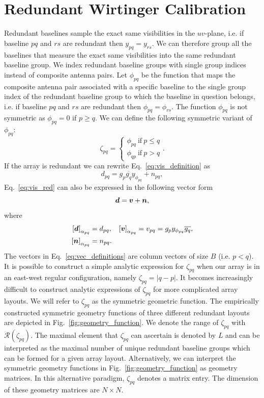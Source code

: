 \documentclass[useAMS,usenatbib]{mn2e}
\newcommand{\bd}{\bmath{d}}
\newcommand{\bv}{\bmath{v}}
\newcommand{\bn}{\bmath{n}}
\newcommand{\conj}[1]{\overline{#1}}
\begin{document}
\section{Redundant Wirtinger Calibration}
\label{sec:red_wirtinger}
Redundant baselines sample the exact same visibilities in the $uv$-plane, i.e. if baseline $pq$ and $rs$ are redundant then $y_{pq} = y_{rs}$. 
We can therefore group all the baselines that measure the exact same visibilities into the same redundant baseline group. We index redundant baseline 
groups with single group indices instead of composite antenna pairs. Let $\phi_{pq}$ be the function that maps the composite antenna pair associated with a specific baseline 
to the single group index of the redundant baseline group to which the baseline in question belongs, i.e. if baseline $pq$ and $rs$ are redundant then $\phi_{pq} = \phi_{rs}$.  
The function $\phi_{pq}$ is not symmetric as 
$\phi_{pq} = 0$ if $p\geq q$. We can define the following symmetric variant of $\phi_{pq}$:
\begin{equation}
\zeta_{pq} = 
\begin{cases}
\phi_{pq}~\textrm{if}~p \leq q\\
\phi_{qp}~\textrm{if}~p>q
\end{cases}.
\end{equation} 
If the array is redundant we can rewrite Eq.~\eqref{eq:vis_definition} as
\begin{equation}
\label{eq:vis_red}
d_{pq} = g_{p}\conj{g_q}y_{\phi_{pq}} + n_{pq},
\end{equation}
Eq.~\eqref{eq:vis_red} can also be expressed in the following vector form 
\begin{equation}
\label{eq:vis_red_vec}
\bd = \bv + \bn, 
\end{equation}
where 
\begin{align}
 \left [ \bd \right]_{\alpha_{pq}} &= d_{pq}, & \left [ \bv \right ]_{\alpha_{pq}} &= v_{pq}=g_p y_{\phi_{pq}} \conj{g_q},\nonumber\\
 \left [ \bn \right ]_{\alpha_{pq}} &= n_{pq}. &  &\label{eq:vec_definitions}
\end{align}
The vectors in Eq.~\eqref{eq:vec_definitions} are column vectors of size $B$ (i.e. $p<q$). 
It is possible to construct a simple analytic expression for $\zeta_{pq}$ when our array is in an east-west regular configuration, namely $\zeta_{pq} = |q-p|$. 
It becomes increasingly difficult to construct analytic expressions of $\zeta_{pq}$ for more complicated array layouts. 
We will refer to $\zeta_{pq}$ as the symmetric geometric function. The empirically constructed symmetric geometry
functions of three different redundant layouts are depicted in Fig.~\ref{fig:geometry_function}. We denote the range of $\zeta_{pq}$ with $\mathcal{R}(\zeta_{pq})$. The maximal element 
that $\zeta_{pq}$ can ascertain is denoted by $L$ and can be interpreted as the maximal number of unique redundant baseline groups which can be formed for a given 
array layout. Alternatively, we can interpret the symmetric geometry functions in Fig.~\ref{fig:geometry_function} as geometry matrices. In this alternative paradigm, $\zeta_{pq}$ denotes a matrix entry. The dimension of these geometry 
matrices are $N\times N$.
\end{document}

